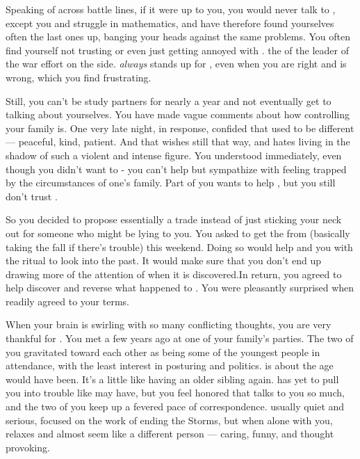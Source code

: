 \documentclass[char]{GL2020}
\begin{document}
{Speaking of across battle lines, if it were up to you, you would never talk to \cWarlorddaughter{\full}, except you and \cWarlordDaughter{} struggle in mathematics, and have therefore found yourselves often the last ones up, banging your heads against the same problems. You often find yourself not trusting or even just getting annoyed with \cWarlordDaughter{}. \cWarlordDaughter{\They \are} the \cWarlordDaughter{\offspring} of the leader of the war effort on the \cShip{} side. \cPresident{} \emph{always} stands up for \cWarlordsDaughter{\them}, even when you are right and \cWarlordDaughter{} is wrong, which you find frustrating. 

Still, you can’t be study partners for nearly a year and not eventually get to talking about yourselves.  You have made vague comments about how controlling your family is.  One very late night, in response,  \cWarlordDaughter{} confided that  \cWarlordDaughter{\their} \cLoud{\parent} used to be different — peaceful, kind, patient. And that \cWarlordDaughter{} wishes \cLoud{\they} \cLoud{\were} still that way, and hates living in the shadow of such a violent and intense figure. You understood immediately, even though you didn’t want to - you can’t help but sympathize with feeling trapped by the circumstances of one’s family. Part of you wants to help \cWarLordDaughter{} , but you still don’t trust \cWarlordDaughter{\them}. 

So you decided to propose essentially a trade instead of just sticking your neck out for someone who might be lying to you. You asked \cWarlordDaughter{} to get the \iMirror{} from \cDiplomat{} (basically taking the fall if there’s trouble) this weekend. Doing so would help \cPresident{} and you with the ritual to look into the past. It would make sure that you don’t end up drawing more of the attention of \cDiplomat{} when it is discovered.In return, you agreed to help \cWarlordDaughter{} discover and reverse what happened to \cWarlordsDaughter{\their}  \cLoud{\parent} \cLoud{}. You were pleasantly surprised when \cWarlordDaughter{\they} readily agreed to your terms. 

When your brain is swirling with so many conflicting thoughts, you are very thankful for \cAssistantScientist{\full}. You met \cAssistantScientist{\them} a few years ago at one of your family’s parties. The two of you gravitated toward each other as being some of the youngest people in attendance, with the least interest in posturing and politics. \cAssistantScientist{} is about the age \cHeirSibling{} would have been. It's a little like having an older sibling again. \cAssistantScientist{} has yet to pull you into trouble like \cHeirSibling{} may have, but you feel honored that \cAssistantScientist{} talks to you so much, and the two of you keep up a fevered pace of correspondence. \cAssistantScientist{\They} \cAssistantScientist{\are} usually quiet and serious, focused on the work of ending the Storms, but when \cAssistantScientist{\they} \cAssistantScientist{\are} alone with you, \cAssistantScientist{\they} relaxes and almost seem\cAssistantScientist{\verbs} like a different person — caring, funny, and thought provoking. 

}
\end{document}
